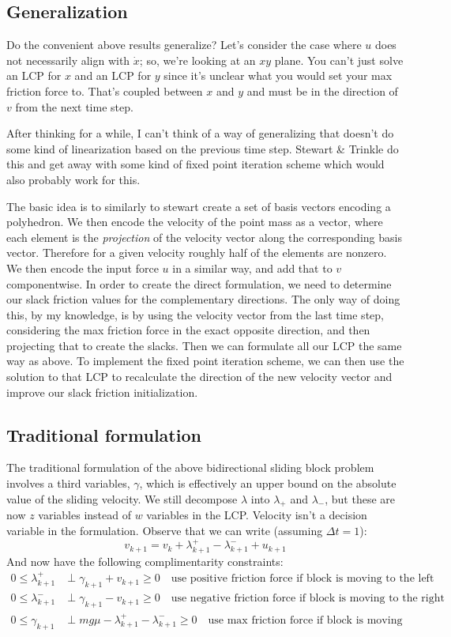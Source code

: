 \documentclass{article}
\begin{document}
\subsection{Generalization}
Do the convenient above results generalize? Let's consider the case where $u$ does not necessarily align with $\dot x$; so, we're looking at an $xy$ plane. You can't just solve an LCP for $x$ and an LCP for $y$ since it's unclear what you would set your max friction force to. That's coupled between $x$ and $y$ and must be in the direction of $v$ from the next time step. 

After thinking for a while, I can't think of a way of generalizing that doesn't do some kind of linearization based on the previous time step. Stewart \& Trinkle do this and get away with some kind of fixed point iteration scheme which would also probably work for this.

The basic idea is to similarly to stewart create a set of basis vectors encoding a polyhedron. We then encode the velocity of the point mass as a vector, where each element is the \textit{projection} of the velocity vector along the corresponding basis vector. Therefore for a given velocity roughly half of the elements are nonzero. We then encode the input force $u$ in a similar way, and add that to $v$ componentwise. In order to create the direct formulation, we need to determine our slack friction values for the complementary directions. The only way of doing this, by my knowledge, is by using the velocity vector from the last time step, considering the max friction force in the exact opposite direction, and then projecting that to create the slacks. Then we can formulate all our LCP the same way as above. To implement the fixed point iteration scheme, we can then use the solution to that LCP to recalculate the direction of the new velocity vector and improve our slack friction initialization.

\subsection{Traditional formulation}
The traditional formulation of the above bidirectional sliding block problem involves a third variables, $\gamma$, which is effectively an upper bound on the absolute value of the sliding velocity. We still decompose $\lambda$ into $\lambda_+$ and $\lambda_-$, but these are now $z$ variables instead of $w$ variables in the LCP. Velocity isn't a decision variable in the formulation. Observe that we can write (assuming $\Delta t = 1$):
\[
    v_{k+1} = v_k + \lambda^+_{k+1} - \lambda^-_{k+1} + u_{k+1}
\]
And now have the following complimentarity constraints:
\begin{align*}
    0 \leq \lambda^+_{k+1} &\perp \gamma_{k+1} + v_{k+1} \geq 0 \quad \textrm{use positive friction force if block is moving to the left}\\
    0 \leq \lambda^-_{k+1} &\perp \gamma_{k+1} - v_{k+1} \geq 0 \quad \textrm{use negative friction force if block is moving to the right}\\
    0 \leq \gamma_{k+1} &\perp m g \mu - \lambda^+_{k+1} - \lambda^-_{k+1} \geq 0 \quad \textrm{use max friction force if block is moving}
\end{align*}
\end{document}
